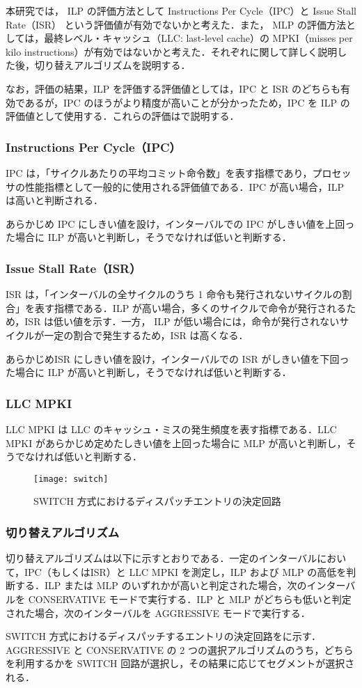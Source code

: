 本研究では， ILP の評価方法として Instructions Per Cycle（IPC）と Issue Stall Rate（ISR） という評価値が有効でないかと考えた．また， MLP の評価方法としては，最終レベル・キャッシュ（LLC: last-level cache）の MPKI（misses per kilo instructions）が有効ではないかと考えた．それぞれに関して詳しく説明した後，切り替えアルゴリズムを説明する．

なお，評価の結果，ILP を評価する評価値としては，IPC と ISR のどちらも有効であるが，IPC のほうがより精度が高いことが分かったため，IPC を ILP の評価値として使用する．これらの評価はで説明する．

\subsubsection{Instructions Per Cycle（IPC）}
IPC は，「サイクルあたりの平均コミット命令数」を表す指標であり，プロセッサの性能指標として一般的に使用される評価値である．IPC が高い場合，ILP は高いと判断される．

あらかじめ IPC にしきい値を設け，インターバルでの IPC がしきい値を上回った場合に ILP が高いと判断し，そうでなければ低いと判断する．

\subsubsection{Issue Stall Rate（ISR）}
ISR は，「インターバルの全サイクルのうち 1 命令も発行されないサイクルの割合」を表す指標である．ILP が高い場合，多くのサイクルで命令が発行されるため，ISR は低い値を示す．一方， ILP が低い場合には，命令が発行されないサイクルが一定の割合で発生するため，ISR は高くなる．

あらかじめISR にしきい値を設け，インターバルでの ISR がしきい値を下回った場合に ILP が高いと判断し，そうでなければ低いと判断する．

\subsubsection{LLC MPKI}
LLC MPKI は LLC のキャッシュ・ミスの発生頻度を表す指標である．LLC MPKI があらかじめ定めたしきい値を上回った場合に MLP が高いと判断し，そうでなければ低いと判断する．

\begin{figure}[htb]
  \centering
  \texttt{[image: switch]}
  \caption{SWITCH 方式におけるディスパッチエントリの決定回路}
  \label{fig:switch}
\end{figure}

\subsubsection{切り替えアルゴリズム}
切り替えアルゴリズムは以下に示すとおりである．一定のインターバルにおいて，IPC（もしくはISR）と LLC MPKI を測定し，ILP および MLP の高低を判断する．ILP または MLP のいずれかが高いと判定された場合，次のインターバルを CONSERVATIVE モードで実行する．ILP と MLP がどちらも低いと判定された場合，次のインターバルを AGGRESSIVE モードで実行する．

SWITCH 方式におけるディスパッチするエントリの決定回路をに示す．AGGRESSIVE と CONSERVATIVE の 2 つの選択アルゴリズムのうち，どちらを利用するかを SWITCH 回路が選択し，その結果に応じてセグメントが選択される．
